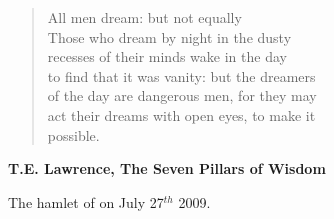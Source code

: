 \begin{quote}
    All men dream: but not equally\\
Those who dream by night in the dusty\\
recesses of their minds wake in the day\\
to find that it was vanity: but the dreamers\\
of the day are dangerous men, for they may\\
act their dreams with open eyes, to make it\\
possible.
\end{quote}
\textbf{T.E. Lawrence, The Seven Pillars of Wisdom}


\begin{pagefigure}
\checkoddpage \ifoddpage \forcerectofloat \else \forceversofloat \fi
{}
\caption{The hamlet of \protect{} on July 27\(^{th}\) 2009. }
\end{pagefigure}